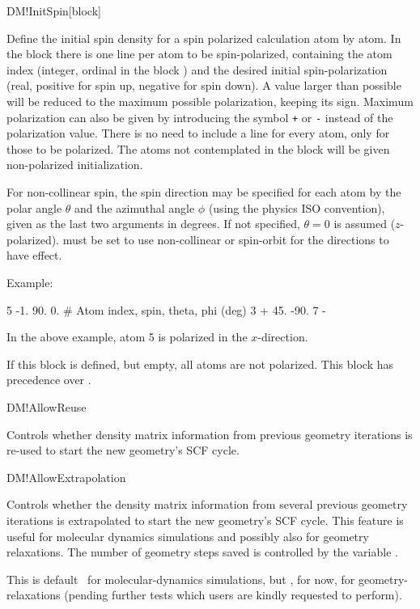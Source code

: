 \begin{fdfentry}{DM!InitSpin}[block]
  
  Define the initial spin density for a spin polarized calculation
  atom by atom. In the block there is one line per atom to be
  spin-polarized, containing the atom index (integer, ordinal in the
  block ) and the desired
  initial spin-polarization (real, positive for spin up, negative for
  spin down). A value larger than possible will be reduced to the
  maximum possible polarization, keeping its sign. Maximum
  polarization can also be given by introducing the symbol \texttt{+}
  or \texttt{-} instead of the polarization value. There is no need
  to include a line for every atom, only for those to be
  polarized. The atoms not contemplated in the block will be given
  non-polarized initialization. 

  For non-collinear spin, the spin direction may be specified for each
  atom by the polar angle $\theta$ and the azimuthal angle $\phi$
  (using the physics ISO convention), given as the last two arguments
  in degrees. If not specified, $\theta=0$ is assumed
  ($z$-polarized).  must be set to use non-collinear or
  spin-orbit for the directions to have effect.

  Example:
  \begin{fdfexample}
        5  -1.   90.   0.   # Atom index, spin, theta, phi (deg)
        3   +    45. -90.
        7   -
  \end{fdfexample}
  In the above example, atom 5 is polarized in the $x$-direction.

  If this block is defined, but empty, all atoms are not polarized.
  This block has precedence over .

\end{fdfentry}

\begin{fdflogicalT}{DM!AllowReuse}

  Controls whether density matrix information from previous geometry
  iterations is re-used to start the new geometry's SCF cycle.
  
\end{fdflogicalT}

\begin{fdflogicalT}{DM!AllowExtrapolation}

  Controls whether the density matrix information from several
  previous geometry iterations is extrapolated to start the new
  geometry's SCF cycle.  This feature is useful for molecular dynamics
  simulations and possibly also for geometry relaxations.  The number
  of geometry steps saved is controlled by the variable
  .

  This is default \fdftrue\ for molecular-dynamics simulations, but
  \fdffalse, for now, for geometry-relaxations (pending further tests
  which users are kindly requested to perform).

\end{fdflogicalT}


